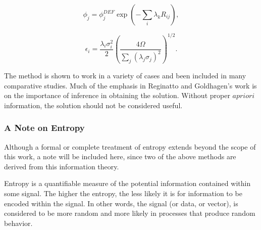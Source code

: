 \begin{equation}
\label{eqn:maxed-flux}
\phi_j = \phi_j^{DEF} \exp(- \sum_i \lambda_k R_{ij}) ,
\end{equation}

\begin{equation}
\label{eqn:maxed-error}
\epsilon_i = \frac{\lambda_i \sigma_i^2}{2} (\frac{4 \Omega}{\sum_j (\lambda_j \sigma_j)^2})^{1/2} .
\end{equation}

The method is shown to work in a variety of cases and been included in many comparative studies.
Much of the emphasis in Reginatto and Goldhagen's work is on the importance of inference in obtaining the solution.
Without proper $a priori$ information, the solution should not be considered useful.


\subsubsection{A Note on Entropy}
Although a formal or complete treatment of entropy extends beyond the scope of this work, a note will be included here, since two of the above methods are derived from this information theory.

Entropy is a quantifiable measure of the potential information contained within some signal.
The higher the entropy, the less likely it is for information to be encoded within the signal.
In other words, the signal (or data, or vector), is considered to be more random and more likely in processes that produce random behavior.

